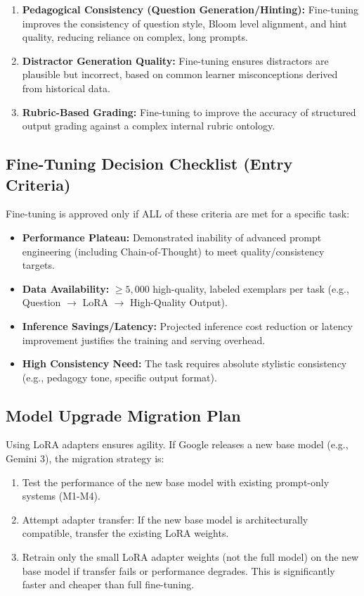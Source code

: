\documentclass[12pt]{article}
\begin{document}
\begin{enumerate}
\begin{enumerate}
    \item \textbf{Pedagogical Consistency (Question Generation/Hinting):} Fine-tuning improves the consistency of question style, Bloom level alignment, and hint quality, reducing reliance on complex, long prompts.
    \item \textbf{Distractor Generation Quality:} Fine-tuning ensures distractors are plausible but incorrect, based on common learner misconceptions derived from historical data.
    \item \textbf{Rubric-Based Grading:} Fine-tuning to improve the accuracy of structured output grading against a complex internal rubric ontology.
\end{enumerate}

\subsection{Fine-Tuning Decision Checklist (Entry Criteria)}
Fine-tuning is approved only if ALL of these criteria are met for a specific task:
\begin{itemize}[noitemsep]
    \item \textbf{Performance Plateau:} Demonstrated inability of advanced prompt engineering (including Chain-of-Thought) to meet quality/consistency targets.
    \item \textbf{Data Availability:} $\ge 5,000$ high-quality, labeled exemplars per task (e.g., Question $\rightarrow$ LoRA $\rightarrow$ High-Quality Output).
    \item \textbf{Inference Savings/Latency:} Projected inference cost reduction or latency improvement justifies the training and serving overhead.
    \item \textbf{High Consistency Need:} The task requires absolute stylistic consistency (e.g., pedagogy tone, specific output format).
\end{itemize}

\subsection{Model Upgrade Migration Plan}
Using LoRA adapters ensures agility. If Google releases a new base model (e.g., Gemini 3), the migration strategy is:
\begin{enumerate}
    \item Test the performance of the new base model with existing prompt-only systems (M1-M4).
    \item Attempt adapter transfer: If the new base model is architecturally compatible, transfer the existing LoRA weights.
    \item Retrain only the small LoRA adapter weights (not the full model) on the new base model if transfer fails or performance degrades. This is significantly faster and cheaper than full fine-tuning.
\end{enumerate}


\end{enumerate}
\end{document}
